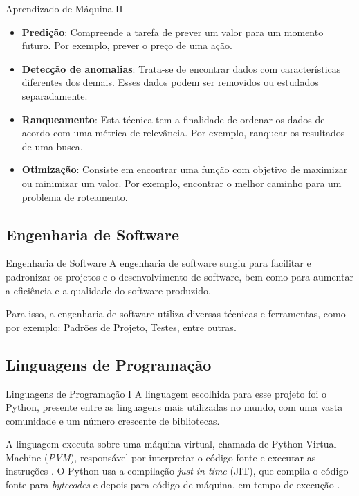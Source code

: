 \begin{frame}{Aprendizado de Máquina II}
	\begin{itemize}
		\item \textbf{Predição}: Compreende a tarefa de prever um valor para um momento futuro. Por exemplo, prever o preço de uma ação.
		\item \textbf{Detecção de anomalias}: Trata-se de encontrar dados com características diferentes dos demais. Esses dados podem ser removidos ou estudados separadamente.
		\item \textbf{Ranqueamento}: Esta técnica tem a finalidade de ordenar os dados de acordo com uma métrica de relevância. Por exemplo, ranquear os resultados de uma busca.
		\item \textbf{Otimização}: Consiste em encontrar uma função com objetivo de maximizar ou minimizar um valor. Por exemplo, encontrar o melhor caminho para um problema de roteamento.
	\end{itemize}
\end{frame}

\subsection{Engenharia de Software}
\label{subsec:engenharia-de-software}

\begin{frame}{Engenharia de Software}
	\quad A engenharia de software surgiu para facilitar e padronizar os projetos e o desenvolvimento de software, bem como para aumentar a eficiência e a qualidade do software produzido.

	\medskip

	\quad Para isso, a engenharia de software utiliza diversas técnicas e ferramentas, como por exemplo: Padrões de Projeto, Testes, entre outras.
\end{frame}

\subsection{Linguagens de Programação}
\label{subsec:linguagens-de-programacao}

\begin{frame}{Linguagens de Programação I}
	\quad A linguagem escolhida para esse projeto foi o Python, presente entre as linguagens mais utilizadas no mundo, com uma vasta comunidade e um número crescente de bibliotecas.

	\quad A linguagem executa sobre uma máquina virtual, chamada de Python Virtual Machine (\textit{PVM}), responsável por interpretar o código-fonte e executar as instruções \cite{pvm-2017}. O Python usa a compilação \textit{just-in-time} (JIT), que compila o código-fonte para \textit{bytecodes} e depois para código de máquina, em tempo de execução \cite{pvm-2017}.
\end{frame}

